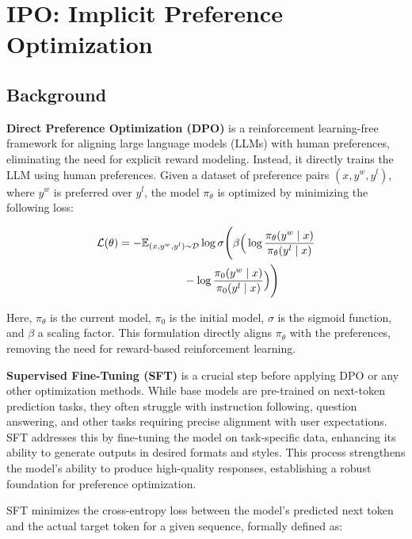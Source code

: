 \section{IPO: Implicit Preference Optimization}
\label{DPO}
\subsection{Background}


\textbf{Direct Preference Optimization (DPO)} is a reinforcement learning-free framework for aligning large language models (LLMs) with human preferences, eliminating the need for explicit reward modeling. Instead, it directly trains the LLM using human preferences.
Given a dataset of preference pairs \((x, y^w, y^l)\), where \(y^w\) is  preferred over \(y^l\), the model \(\pi_\theta\) is optimized by minimizing the following loss:

\begin{equation}
\begin{aligned}
\mathcal{L}(\theta) = -\mathbb{E}_{(x, y^w, y^l) \sim \mathcal{D}} 
\log \sigma \Bigg( \beta \Big( 
& \log \frac{\pi_\theta(y^w \mid x)}{\pi_\theta(y^l \mid x)} \\
& \hspace{-2cm} - \log \frac{\pi_0(y^w \mid x)}{\pi_0(y^l \mid x)} 
\Big) \Bigg)
\end{aligned}
\end{equation}

Here, \(\pi_\theta\) is the current model, \(\pi_0\) is the initial model, \(\sigma\) is the sigmoid function, and \(\beta\) a scaling factor. This formulation directly aligns \(\pi_\theta\) with the preferences, removing the need for reward-based reinforcement learning.

\textbf{Supervised Fine-Tuning (SFT)} is a crucial step before applying DPO or any other optimization methods. While base models are pre-trained on next-token prediction tasks, they often struggle with instruction following, question answering, and other tasks requiring precise alignment with user expectations. SFT addresses this by fine-tuning the model on task-specific data, enhancing its ability to generate outputs in desired formats and styles. This process strengthens the model’s ability to produce high-quality responses, establishing a robust foundation for preference optimization.

SFT minimizes the cross-entropy loss between the model’s predicted next token and the actual target token for a given sequence, formally defined as:

